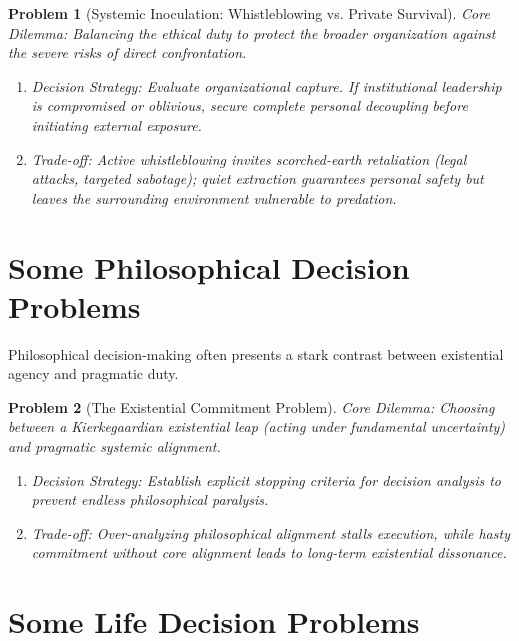 \documentclass{article}
\newtheorem{problem}{Problem}
\begin{document}
\begin{problem}[Systemic Inoculation: Whistleblowing vs. Private Survival]
	\emph{Core Dilemma:} Balancing the ethical duty to protect the broader organization against the severe risks of direct confrontation.
	\begin{enumerate}[label=(\roman*)]
		\item \emph{Decision Strategy:} Evaluate organizational capture. If institutional leadership is compromised or oblivious, secure complete personal decoupling before initiating external exposure.
		\item \emph{Trade-off:} Active whistleblowing invites scorched-earth retaliation (legal attacks, targeted sabotage); quiet extraction guarantees personal safety but leaves the surrounding environment vulnerable to predation.
	\end{enumerate}
\end{problem}

\section{Some Philosophical Decision Problems}

Philosophical decision-making often presents a stark contrast between existential agency and pragmatic duty.

\begin{problem}[The Existential Commitment Problem]
	\emph{Core Dilemma:} Choosing between a Kierkegaardian existential leap (acting under fundamental uncertainty) and pragmatic systemic alignment.
	\begin{enumerate}[label=(\roman*)]
		\item \emph{Decision Strategy:} Establish explicit stopping criteria for decision analysis to prevent endless philosophical paralysis.
		\item \emph{Trade-off:} Over-analyzing philosophical alignment stalls execution, while hasty commitment without core alignment leads to long-term existential dissonance.
	\end{enumerate}
\end{problem}

\section{Some Life Decision Problems}
\end{document}
